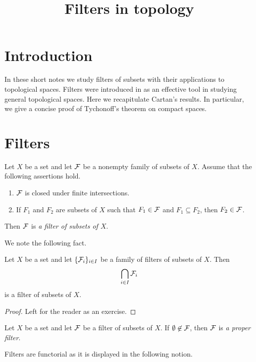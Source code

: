 



\title{Filters in topology}
\date{}
\maketitle

\section{Introduction}
\noindent
In these short notes we study filters of subsets with their applications to topological spaces. Filters were introduced in \cite{cartan1937filters} as an effective tool in studying general topological spaces. Here we recapitulate Cartan's results. In particular, we give a concise proof of Tychonoff's theorem on compact spaces.

\section{Filters}

\begin{definition}
Let $X$ be a set and let ${\mathcal F}$ be a nonempty family of subsets of $X$. Assume that the following assertions hold.
\begin{enumerate}[label=\textbf{(\arabic*)}, leftmargin=*]
\item ${\mathcal F}$ is closed under finite intersections.
\item If $F_1$ and $F_2$ are subsets of $X$ such that $F_1 \in {\mathcal F}$ and $F_1\subseteq F_2$, then $F_2 \in {\mathcal F}$.
\end{enumerate}
Then ${\mathcal F}$ is \textit{a filter of subsets of $X$}.
\end{definition}
\noindent
We note the following fact. 

\begin{fact}\label{fact:filters_are_closed_under_intersections}
Let $X$ be a set and let $\{{\mathcal F}_i\}_{i\in I}$ be a family of filters of subsets of $X$. Then 
$$\bigcap_{i\in I}{\mathcal F}_i$$
is a filter of subsets of $X$.
\end{fact}
\begin{proof}
Left for the reader as an exercise.
\end{proof}

\begin{definition}
Let $X$ be a set and let ${\mathcal F}$ be a filter of subsets of $X$. If $\emptyset \not \in {\mathcal F}$, then ${\mathcal F}$ is \textit{a proper filter}.
\end{definition}
\noindent
Filters are functorial as it is displayed in the following notion. 

